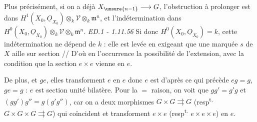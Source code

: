  Plus précisément, si on a déjà $X_{\unsure{n-1}}\longrightarrow G$, l'obstruction à prolonger est dans $H^1(X_0,\underline O_{X_0})\otimes_k\mathcal V\otimes_k\mathfrak m^n$, et l'indétermination dans $H^0(X_0,\underline O_{X_0})\otimes_k\mathcal V\otimes_k\mathfrak m^n$.
\hfill\textit{ED.1 - 1.11.56}
 Si donc $H^0(X_0,\underline O_{X_0})=k$, cette indétermination ne dépend  de $k$ : elle est levée en exigeant que une  marquée $s$ de $X$ aille sur  section   // D'où en l'occurrence la possibilité de  l'extension, avec la condition que la section $e\times e$ vienne en $e$.

De plus,  et $ge$, elles transforment $e$ en $e$ donc $e$ est  d'après ce qui précède $eg=g$, $ge=g$ : $e$ est section unité bilatère. Pour la $=$ raison, on voit que $gg'=g'g$ et $(gg')g''=g(g'g'')$, car on a deux morphismes $G\times G\rightrightarrows G$ (resp\textsuperscript{t.} $G\times G\times G\rightrightarrows G$) qui coïncident  et transforment $e\times e$ (resp\textsuperscript{t.} $e\times e\times e$) en $e$.

